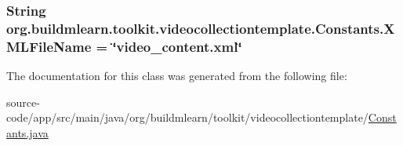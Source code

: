 \subsubsection[{\texorpdfstring{X\+M\+L\+File\+Name}{XMLFileName}}]{\setlength{\rightskip}{0pt plus 5cm}String org.\+buildmlearn.\+toolkit.\+videocollectiontemplate.\+Constants.\+X\+M\+L\+File\+Name = \char`\"{}video\+\_\+content.\+xml\char`\"{}\hspace{0.3cm}{\ttfamily [static]}}\hypertarget{classorg_1_1buildmlearn_1_1toolkit_1_1videocollectiontemplate_1_1Constants_a6ca0b8cc526afb21e3896ef3231f0619}{}\label{classorg_1_1buildmlearn_1_1toolkit_1_1videocollectiontemplate_1_1Constants_a6ca0b8cc526afb21e3896ef3231f0619}


The documentation for this class was generated from the following file\+:\begin{DoxyCompactItemize}
\item 
source-\/code/app/src/main/java/org/buildmlearn/toolkit/videocollectiontemplate/\hyperlink{videocollectiontemplate_2Constants_8java}{Constants.\+java}\end{DoxyCompactItemize}
